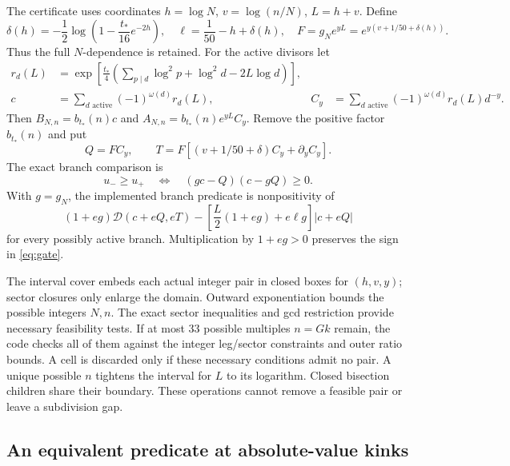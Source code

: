 \documentclass[11pt]{article}
\theoremstyle{remark}
\newcommand{\tstar}{t_*}
\numberwithin{equation}{section}
\begin{document}
The certificate uses coordinates $h=\log N$, $v=\log(n/N)$, $L=h+v$.
Define
\begin{equation}\label{eq:coords}
 \delta(h)=-\frac12\log\left(1-\frac{\tstar}{16}e^{-2h}\right),\quad
 \ell=\frac1{50}-h+\delta(h),\quad
 F=g_Ne^{yL}=e^{y(v+1/50+\delta(h))}.
\end{equation}
Thus the full $N$-dependence is retained. For the active divisors let
\begin{align}
 r_d(L)&=\exp\!\left[\frac{\tstar}{4}
 \left(\sum_{p\mid d}\log^2p+\log^2d-2L\log d\right)\right],\label{eq:rd}\\
 c&=\sum_{d\text{ active}}(-1)^{\omega(d)}r_d(L),
 &C_y&=\sum_{d\text{ active}}(-1)^{\omega(d)}r_d(L)d^{-y}.\label{eq:cy}
\end{align}
Then $B_{N,n}=b_{\tstar}(n)c$ and
$A_{N,n}=b_{\tstar}(n)e^{yL}C_y$. Remove the positive factor
$b_{\tstar}(n)$ and put
\begin{equation}\label{eq:QT}
 Q=FC_y,\qquad T=F[(v+1/50+\delta)C_y+\partial_yC_y].
\end{equation}
The exact branch comparison is
\begin{equation}\label{eq:activity}
 u_-\ge u_+\quad\Longleftrightarrow\quad(gc-Q)(c-gQ)\ge0.
\end{equation}
With $g=g_N$, the implemented branch predicate is nonpositivity of
\begin{equation}\label{eq:predicate}
 (1+eg)\mathcal D(c+eQ,eT)
 -\left[\frac L2(1+eg)+e\ell g\right]|c+eQ|
\end{equation}
for every possibly active branch. Multiplication by $1+eg>0$ preserves
the sign in \eqref{eq:gate}.

The interval cover embeds each actual integer pair in closed boxes for
$(h,v,y)$; sector closures only enlarge the domain. Outward
exponentiation bounds the possible integers $N,n$. The exact sector
inequalities and gcd restriction provide necessary feasibility tests.
If at most 33 possible multiples $n=Gk$ remain, the code checks all of
them against the integer leg/sector constraints and outer ratio bounds.
A cell is discarded only if these necessary conditions admit no pair.
A unique possible $n$ tightens the interval for $L$ to its logarithm.
Closed bisection children share their boundary. These operations cannot
remove a feasible pair or leave a subdivision gap.

\subsection{An equivalent predicate at absolute-value kinks}
\end{document}
